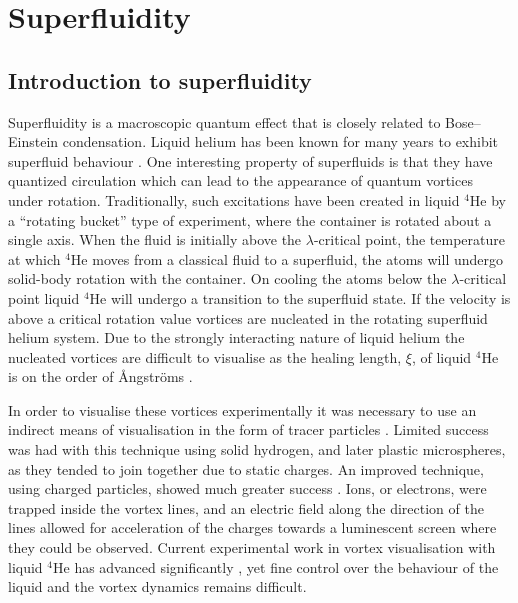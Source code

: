 \section{Superfluidity}\label{sec:superfluid}
\subsection{Introduction to superfluidity}

Superfluidity is a macroscopic quantum effect that is closely related to Bose--Einstein condensation. Liquid helium has been known for many years to exhibit superfluid behaviour \cite{BEC:Penrose_pr_1956}. One interesting property of superfluids is that they have quantized circulation which can lead to the appearance of quantum vortices under rotation. Traditionally, such excitations have been created in liquid $^4$He by a ``rotating bucket'' type of experiment, where the container is rotated about a single axis. When the fluid is initially above the $\lambda$-critical point, the temperature at which $^4$He moves from a classical fluid to a superfluid, the atoms will undergo solid-body rotation with the container. On cooling the atoms below the $\lambda$-critical point liquid $^4$He will undergo a transition to the superfluid state. If the velocity is above a critical rotation value vortices are nucleated in the rotating superfluid helium system. Due to the strongly interacting nature of liquid helium the nucleated vortices are difficult to visualise as the healing length, $\xi$, of liquid $^4$He is on the order of {\r{A}}ngstr{\"o}ms \cite{BEC:Srinivasen_pramana_2006}.

In order to visualise these vortices experimentally it was necessary to use an indirect means of visualisation in the form of tracer particles \cite{BEC:Packard_physb_1982}. Limited success was had with this technique using solid hydrogen, and later plastic microspheres, as they tended to join together due to static charges. An improved technique, using charged particles, showed much greater success \cite{Vtx:Packard_prl_1969}. Ions, or electrons, were trapped inside the vortex lines, and an electric field along the direction of the lines allowed for acceleration of the charges towards a luminescent screen where they could be observed. Current experimental work in vortex visualisation with liquid $^4$He has advanced significantly \cite{Vtx:Tsubota_arxiv_2010,Vtx:Guo_pnas_2014}, yet fine control over the behaviour of the liquid and the vortex dynamics remains difficult.

